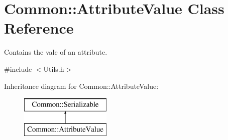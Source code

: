 \hypertarget{class_common_1_1_attribute_value}{\section{Common\-:\-:Attribute\-Value Class Reference}
\label{class_common_1_1_attribute_value}
}


Contains the vale of an attribute.  




{\ttfamily \#include $<$Utils.\-h$>$}

Inheritance diagram for Common\-:\-:Attribute\-Value\-:\begin{figure}[H]
\begin{center}
\leavevmode
\includegraphics[height=2.000000cm]{class_common_1_1_attribute_value}
\end{center}
\end{figure}
